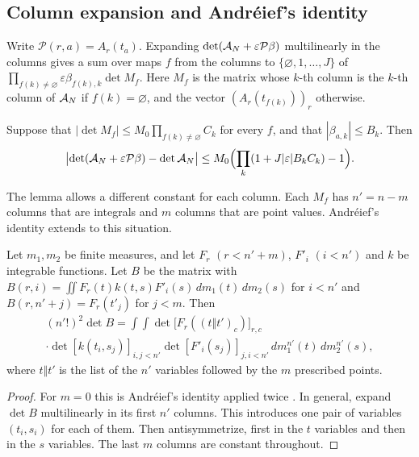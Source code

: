 \subsection{Column expansion and Andr\'eief's identity}\label{ssec:andreief}
Write $\mathcal P(r,a)=A_r(t_a)$. Expanding $\det(\mathcal A_N+\varepsilon\mathcal P\beta)$ multilinearly in the
columns gives a sum over maps $f$ from the columns to $\{\varnothing,1,\ldots,J\}$ of
$\prod_{f(k)\ne\varnothing}\varepsilon\beta_{f(k),k}\det M_f$. Here $M_f$ is the matrix whose $k$-th column is
the $k$-th column of $\mathcal A_N$ if $f(k)=\varnothing$, and the vector $(A_r(t_{f(k)}))_r$ otherwise.

\begin{lemma}\label{lem:expansion}
Suppose that $|\det M_f|\le M_0\prod_{f(k)\ne\varnothing}C_k$ for every $f$, and that $|\beta_{a,k}|\le B_k$.
Then
\[
 \bigl|\det(\mathcal A_N+\varepsilon\mathcal P\beta)-\det\mathcal A_N\bigr|\le M_0\Bigl(\prod_k(1+J|\varepsilon|B_kC_k)-1\Bigr).
\]
\end{lemma}

The lemma allows a different constant for each column. Each $M_f$ has $n'=n-m$ columns that are integrals
and $m$ columns that are point values. Andr\'eief's identity extends to this situation.

\begin{lemma}\label{lem:andreief}
Let $m_1,m_2$ be finite measures, and let $F_r$ $(r<n'+m)$, $F'_i$ $(i<n')$ and $k$ be integrable functions.
Let $B$ be the matrix with $B(r,i)=\iint F_r(t)k(t,s)F'_i(s)\,dm_1(t)\,dm_2(s)$ for $i<n'$ and
$B(r,n'+j)=F_r(t'_j)$ for $j<m$. Then
\begin{multline*}
 (n'!)^2\det B=\int\!\!\int\det\bigl[F_r((t\Vert t')_c)\bigr]_{r,c}\\
 \cdot\det[k(t_i,s_j)]_{i,j<n'}\det[F'_i(s_j)]_{j,i<n'}\,dm_1^{n'}(t)\,dm_2^{n'}(s),
\end{multline*}
where $t\Vert t'$ is the list of the $n'$ variables followed by the $m$ prescribed points.
\end{lemma}

\begin{proof}
For $m=0$ this is Andr\'eief's identity applied twice \cite{Forrester2018Andreief}. In general, expand
$\det B$ multilinearly in its first $n'$ columns. This introduces one pair of variables $(t_i,s_i)$ for each
of them. Then antisymmetrize, first in the $t$ variables and then in the $s$ variables. The last $m$ columns
are constant throughout.
\end{proof}

